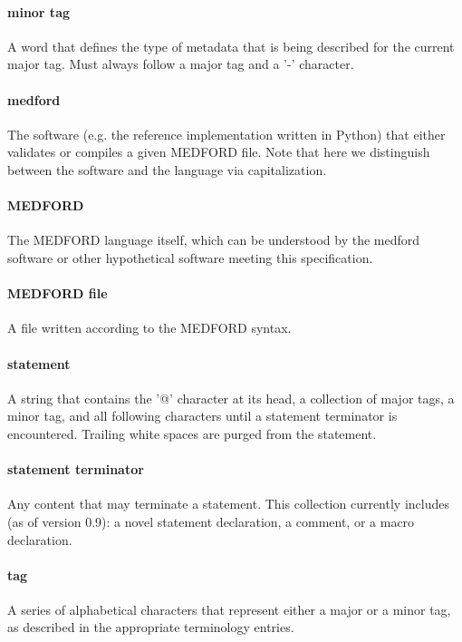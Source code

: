 \documentclass[10pt]{article}
\newcommand{\version}{0.9}
\begin{document}
{{	    \paragraph{minor tag} A word that defines the type of metadata that is being described for the current major tag. Must always follow a major tag and a '-' character.
	    
	    \paragraph{medford} The software (e.g. the reference implementation written in Python) that either validates or compiles a given MEDFORD file. Note that here we distinguish between the software and the language via capitalization.
	    
	    \paragraph{MEDFORD} The MEDFORD language itself, which can be understood by the medford software or other hypothetical software meeting this specification.
	
	    \paragraph{MEDFORD file} A file written according to the MEDFORD syntax.
	    
	    \paragraph{statement} A string that contains the '@' character at its head, a collection of major tags, a minor tag, and all following characters until a statement terminator is encountered. Trailing white spaces are purged from the statement.
	    
	    \paragraph{statement terminator} Any content that may terminate a statement. This collection currently includes (as of version \version): a novel statement declaration, a comment, or a macro declaration.
	    
	    \paragraph{tag} A series of alphabetical characters that represent either a major or a minor tag, as described in the appropriate terminology entries.
	    
}}
\end{document}
